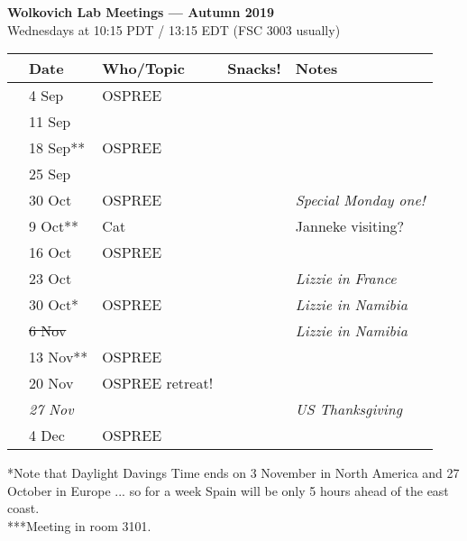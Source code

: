 \documentclass[11pt]{article}
\begin{document}
 
\raggedright
{}

\begin{center} 
{\large \textbf{Wolkovich Lab Meetings --- Autumn 2019}} \\ [2pt]
Wednesdays at 10:15 PDT / 13:15 EDT (FSC 3003 usually)\\
\end{center} 

\begin{center}
\begin{tabular}{ p{0.2 cm}  p{2 cm}  p{5 cm}  p{2 cm}  p{4 cm} }  \hline \hline
 & \textbf{Date}
   & \textbf{Who/Topic}
      & \textbf{Snacks!} 
         & \textbf{Notes} \\ 
\hline \hline
 & 4 Sep & OSPREE &       &  \\\hline
 & 11 Sep & &       &  \\\hline
 & 18 Sep** & OSPREE &       & \\\hline  
 & 25 Sep & &       &  \\\hline
 & 30 Oct & OSPREE &       &  \emph{Special Monday one!}\\\hline
 & 9 Oct** & Cat &     & Janneke visiting? \\\hline
 & 16 Oct& OSPREE &       &  \\\hline %
 & 23 Oct  & &       & \emph{Lizzie in France}  \\\hline
 & 30 Oct* & OSPREE &   & \emph{Lizzie in Namibia}     \\\hline
 & \sout{6 Nov} &  &       &  \emph{Lizzie in Namibia}  \\\hline
 & 13 Nov** & OSPREE &       &  \\\hline
 & 20 Nov & OSPREE retreat!&       &  \\\hline
 & \emph{27 Nov} & &   & \emph{US Thanksgiving} \\\hline
 & 4 Dec & OSPREE &    & \\\hline


\hline
\end{tabular}
\end{center}
*Note that Daylight Davings Time ends on 3 November in North America and 27 October in Europe ... so for a week Spain will be only 5 hours ahead of the east coast.\\
***Meeting in room 3101.
\vspace{10pt}\\
\end{document}

